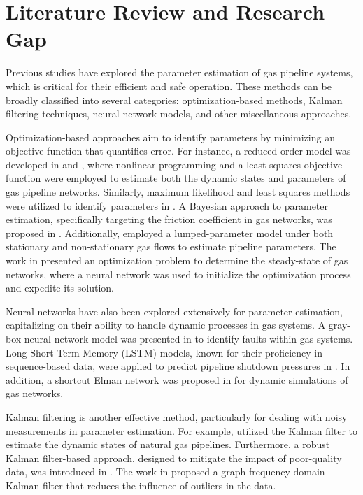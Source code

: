 \section{Literature Review and Research Gap}
Previous studies have explored the parameter estimation of gas pipeline systems, which is critical for their efficient and safe operation. 
These methods can be broadly classified into several categories: optimization-based methods, Kalman filtering techniques, neural network models, and other miscellaneous approaches.

Optimization-based approaches aim to identify parameters by minimizing an objective function that quantifies error. 
For instance, a reduced-order model was developed in \cite{sundarDynamicStateParameter2019} and \cite{sundarStateParameterEstimation2019}, where nonlinear programming and a least squares objective function were employed to estimate both the dynamic states and parameters of gas pipeline networks. 
Similarly, maximum likelihood and least squares methods were utilized to identify parameters in \cite{chenIdentificationCharacteristicParameters2022}.
A Bayesian approach to parameter estimation, specifically targeting the friction coefficient in gas networks, was proposed in \cite{hajianBayesianApproachParameter2019}. 
Additionally, \cite{sukharevIdentificationModelFlow2021} employed a lumped-parameter model under both stationary and non-stationary gas flows to estimate pipeline parameters. 
The work in \cite{cuiDatadrivenComputationNatural2020} presented an optimization problem to determine the steady-state of gas networks, where a neural network was used to initialize the optimization process and expedite its solution.

Neural networks have also been explored extensively for parameter estimation, capitalizing on their ability to handle dynamic processes in gas systems. 
A gray-box neural network model was presented in \cite{cenGrayboxNeuralNetworkbased2013} to identify faults within gas systems. 
Long Short-Term Memory (LSTM) models, known for their proficiency in sequence-based data, were applied to predict pipeline shutdown pressures in \cite{zhengDeeppipeTheoryguidedLSTM2021}. 
In addition, a shortcut Elman network was proposed in \cite{zhouDynamicSimulationNatural2022} for dynamic simulations of gas networks.

Kalman filtering is another effective method, particularly for dealing with noisy measurements in parameter estimation. 
For example, \cite{chenRobustDynamicState2022, chenDynamicStateEstimation2022} utilized the Kalman filter to estimate the dynamic states of natural gas pipelines. 
Furthermore, a robust Kalman filter-based approach, designed to mitigate the impact of poor-quality data, was introduced in \cite{chenRobustKalmanFilterBased2021}. 
The work in \cite{suGraphFrequencyDomainKalman2024} proposed a graph-frequency domain Kalman filter that reduces the influence of outliers in the data.

